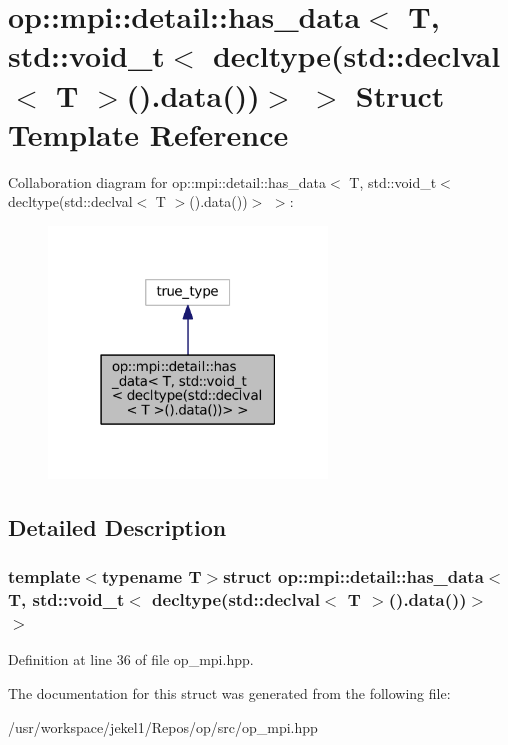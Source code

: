 \hypertarget{structop_1_1mpi_1_1detail_1_1has__data_3_01T_00_01std_1_1void__t_3_01decltype_07std_1_1declval_3524e889c05cc305ced759fca9c8b2769}{\section{op\-:\-:mpi\-:\-:detail\-:\-:has\-\_\-data$<$ T, std\-:\-:void\-\_\-t$<$ decltype(std\-:\-:declval$<$ T $>$().data())$>$ $>$ Struct Template Reference}
\label{structop_1_1mpi_1_1detail_1_1has__data_3_01T_00_01std_1_1void__t_3_01decltype_07std_1_1declval_3524e889c05cc305ced759fca9c8b2769}
}


Collaboration diagram for op\-:\-:mpi\-:\-:detail\-:\-:has\-\_\-data$<$ T, std\-:\-:void\-\_\-t$<$ decltype(std\-:\-:declval$<$ T $>$().data())$>$ $>$\-:
\nopagebreak
\begin{figure}[H]
\begin{center}
\leavevmode
\includegraphics[width=210pt]{structop_1_1mpi_1_1detail_1_1has__data_3_01T_00_01std_1_1void__t_3_01decltype_07std_1_1declval_3de23e1dcf8c8ab7c2518859b32206103}
\end{center}
\end{figure}


\subsection{Detailed Description}
\subsubsection*{template$<$typename T$>$struct op\-::mpi\-::detail\-::has\-\_\-data$<$ T, std\-::void\-\_\-t$<$ decltype(std\-::declval$<$ T $>$().\-data())$>$ $>$}



Definition at line 36 of file op\-\_\-mpi.\-hpp.



The documentation for this struct was generated from the following file\-:\begin{DoxyCompactItemize}
\item 
/usr/workspace/jekel1/\-Repos/op/src/op\-\_\-mpi.\-hpp\end{DoxyCompactItemize}
